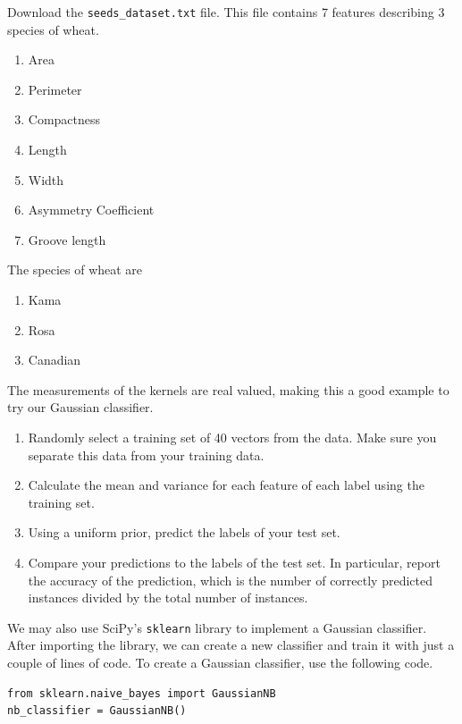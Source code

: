 \begin{problem}
Download the {\tt seeds\_dataset.txt} file.
This file contains 7 features describing 3 species of wheat.
\begin{enumerate}
\item Area
\item Perimeter
\item Compactness
\item Length
\item Width
\item Asymmetry Coefficient
\item Groove length
\end{enumerate}

The species of wheat are
\begin{enumerate}
\item Kama
\item Rosa
\item Canadian
\end{enumerate}

The measurements of the kernels are real valued, making this a good example to try our Gaussian classifier.

\begin{enumerate}
\item Randomly select a training set of 40 vectors from the data.  Make sure you separate this data from your training data.
\item Calculate the mean and variance for each feature of each label using the training set.
\item Using a uniform prior, predict the labels of your test set.
\item Compare your predictions to the labels of the test set. In particular, report the accuracy of the prediction,
which is the number of correctly predicted instances divided by the total number of instances.
\end{enumerate}

\end{problem}

We may also use SciPy's {\tt sklearn} library to implement a Gaussian classifier.
After importing the library, we can create a new classifier and train it with just a couple of lines of code.
To create a Gaussian classifier, use the following code.

\begin{lstlisting}
from sklearn.naive_bayes import GaussianNB
nb_classifier = GaussianNB()
\end{lstlisting}


